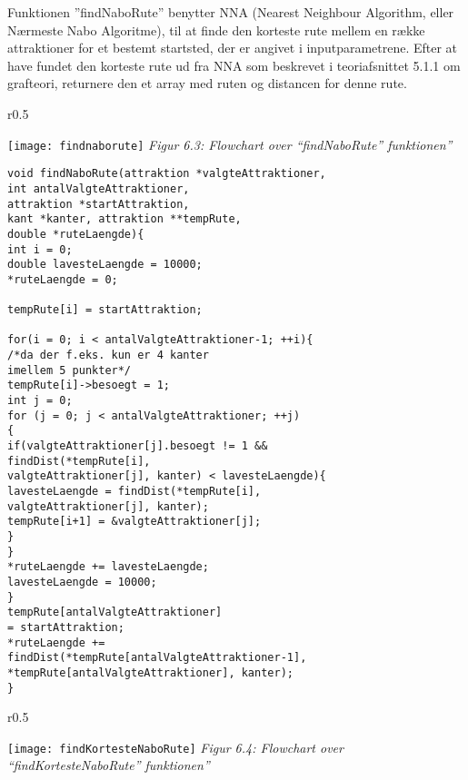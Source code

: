 Funktionen ”findNaboRute” benytter NNA (Nearest Neighbour Algorithm, eller Nærmeste Nabo Algoritme), til at finde den korteste rute mellem en række attraktioner for et bestemt startsted, der er angivet i inputparametrene. Efter at have fundet den korteste rute ud fra NNA som beskrevet i teoriafsnittet 5.1.1 om grafteori, returnere den et array med ruten og distancen for denne rute. \newline

\begin{wrapfigure}{r}{0.5\textwidth}
	\vspace{0pt}
	\begin{center}
		\texttt{[image: findnaborute]}\newline
		\textit{Figur 6.3: Flowchart over “findNaboRute” funktionen”}
	\end{center}
	\vspace{0pt}
	\vspace{0pt}
\end{wrapfigure}

\begin{lstlisting}
void findNaboRute(attraktion *valgteAttraktioner, 
int antalValgteAttraktioner, 
attraktion *startAttraktion, 
kant *kanter, attraktion **tempRute, 
double *ruteLaengde){
int i = 0;
double lavesteLaengde = 10000;
*ruteLaengde = 0;

tempRute[i] = startAttraktion;

for(i = 0; i < antalValgteAttraktioner-1; ++i){ 
/*da der f.eks. kun er 4 kanter 
imellem 5 punkter*/
tempRute[i]->besoegt = 1;
int j = 0;
for (j = 0; j < antalValgteAttraktioner; ++j)
{
if(valgteAttraktioner[j].besoegt != 1 && 
findDist(*tempRute[i], 
valgteAttraktioner[j], kanter) < lavesteLaengde){
lavesteLaengde = findDist(*tempRute[i],
valgteAttraktioner[j], kanter);
tempRute[i+1] = &valgteAttraktioner[j];
}
}
*ruteLaengde += lavesteLaengde;
lavesteLaengde = 10000;
}
tempRute[antalValgteAttraktioner] 
= startAttraktion;
*ruteLaengde += 
findDist(*tempRute[antalValgteAttraktioner-1], 
*tempRute[antalValgteAttraktioner], kanter);
}
\end{lstlisting}

\begin{wrapfigure}{r}{0.5\textwidth}
	\vspace{0pt}
	\begin{center}
		\texttt{[image: findKortesteNaboRute]}\newline
		\textit{Figur 6.4: Flowchart over “findKortesteNaboRute” funktionen”}
	\end{center}
	\vspace{0pt}
	\vspace{0pt}
\end{wrapfigure}


